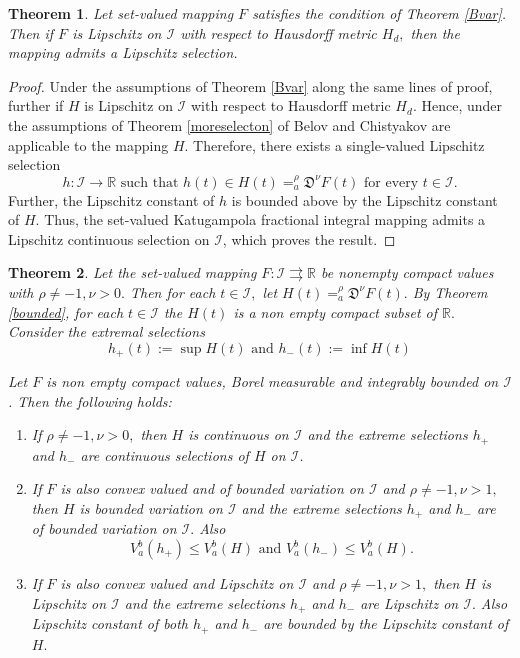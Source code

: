 \documentclass{amsproc}
\newtheorem{theorem}{Theorem}[section]
\theoremstyle{definition}
\theoremstyle{remark}
\numberwithin{equation}{section}
\begin{document}
\begin{theorem}
    Let set-valued mapping $F$ satisfies the condition of Theorem \ref{Bvar}. Then if $F$ is Lipschitz on $\mathcal{I}$ with respect to Hausdorff metric $H_d,$ then the mapping admits a Lipschitz selection.
\end{theorem}
\begin{proof}
    Under the assumptions of Theorem \ref{Bvar} along the same lines of proof, further if $H$ is Lipschitz on $\mathcal{I}$ with respect to Hausdorff metric $H_d.$ Hence, under the assumptions of Theorem \ref{moreselecton} of Belov and Chistyakov \cite{Belov} are applicable to the mapping $H$. Therefore, there exists a single-valued Lipschitz selection
    \[ h:\mathcal{I} \to \mathbb{R} \text{ such that } h(t) \in H(t)= _a^\rho\mathfrak{D}^\nu F(t) \text{ for every } t \in \mathcal{I}. \]
Further, the Lipschitz constant of $h$ is bounded above by the Lipschitz constant of $H.$ Thus, the set-valued Katugampola fractional integral mapping admits a Lipschitz continuous selection on $\mathcal{I}$, which proves the result.
\end{proof}
\begin{theorem}
  Let the set-valued mapping $F:\mathcal{I} \rightrightarrows \mathbb{R}$ be nonempty compact values with $\rho \neq -1, \nu > 0.$ Then for each $t \in \mathcal{I},$ let $H(t)= _a^\rho\mathfrak{D}^\nu F(t).$ By Theorem \ref{bounded}, for each $t \in \mathcal{I}$ the $H(t)$ is a non empty compact subset of $\mathbb{R}.$ Consider the extremal selections  
  \[h_+(t):=\sup H(t) \text{ and }  h_-(t):=\inf H(t)\]
  
  Let $F$ is non empty compact values, Borel measurable and integrably bounded on $\mathcal{I}$. Then the following holds: 
  \begin{enumerate}[label=(\alph*)]
      \item If $ \rho \neq -1, \nu > 0,$ then $H$ is continuous on $\mathcal{I}$ and the extreme selections $h_+$ and $h_-$ are continuous selections of $H$ on $\mathcal{I}$. 
      \item If $F$ is also convex valued and of bounded variation on $\mathcal{I}$ and $ \rho \neq -1, \nu > 1,$ then $H$ is bounded variation on $\mathcal{I}$ and the extreme selections $h_+$ and $h_-$ are of bounded variation on $\mathcal{I}.$ Also 
      \[ V_a^b(h_+) \le V_a^b(H) \text{ and } V_a^b(h_-) \le V_a^b(H).\]
      \item If $F$ is also convex valued and Lipschitz on $\mathcal{I}$ and $ \rho \neq -1, \nu > 1,$ then $H$ is Lipschitz on $\mathcal{I}$ and the extreme selections $h_+$ and $h_-$ are Lipschitz on $\mathcal{I}.$ Also Lipschitz constant of both $h_+$ and $h_-$ are bounded by the Lipschitz constant of $H.$
  \end{enumerate}
\end{theorem}
\end{document}
